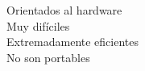 \documentclass[preview]{standalone}
\begin{document}
Orientados al hardware\\Muy difíciles\\Extremadamente eficientes\\No son portables\\
\end{document}
